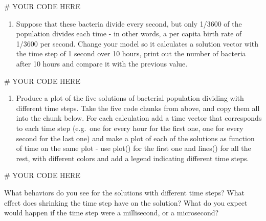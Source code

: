 \documentclass[
  letterpaper,
  DIV=11,
  numbers=noendperiod]{scrreprt}
\newenvironment{Shaded}{\begin{snugshade}}{\end{snugshade}}
\newcommand{\CommentTok}[1]{\textcolor[rgb]{0.37,0.37,0.37}{#1}}
\providecommand{\tightlist}{%
  \setlength{\itemsep}{0pt}\setlength{\parskip}{0pt}}\usepackage{longtable,booktabs,array}
\begin{document}
\begin{Shaded}
\begin{Highlighting}[]
\CommentTok{\# YOUR CODE HERE}
\end{Highlighting}
\end{Shaded}

\begin{enumerate}
\def\labelenumi{\arabic{enumi}.}
\setcounter{enumi}{4}
\tightlist
\item
  Suppose that these bacteria divide every second, but only 1/3600 of
  the population divides each time - in other words, a per capita birth
  rate of 1/3600 per second. Change your model so it calculates a
  solution vector with the time step of 1 second over 10 hours, print
  out the number of bacteria after 10 hours and compare it with the
  previous value.
\end{enumerate}

\begin{Shaded}
\begin{Highlighting}[]
\CommentTok{\# YOUR CODE HERE}
\end{Highlighting}
\end{Shaded}

\begin{enumerate}
\def\labelenumi{\arabic{enumi}.}
\setcounter{enumi}{5}
\tightlist
\item
  Produce a plot of the five solutions of bacterial population dividing
  with different time steps. Take the five code chunks from above, and
  copy them all into the chunk below. For each calculation add a time
  vector that corresponds to each time step (e.g.~one for every hour for
  the first one, one for every second for the last one) and make a plot
  of each of the solutions as function of time on the same plot - use
  plot() for the first one and lines() for all the rest, with different
  colors and add a legend indicating different time steps.
\end{enumerate}

\begin{Shaded}
\begin{Highlighting}[]
\CommentTok{\# YOUR CODE HERE}
\end{Highlighting}
\end{Shaded}

What behaviors do you see for the solutions with different time steps?
What effect does shrinking the time step have on the solution? What do
you expect would happen if the time step were a millisecond, or a
microsecond?
\end{document}

